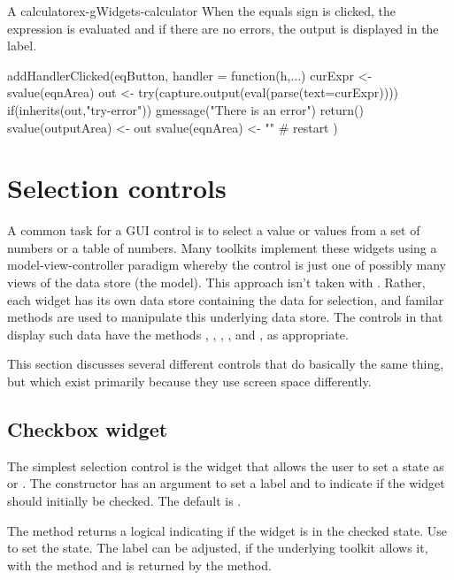 \begin{example}{A calculator}{ex-gWidgets-calculator}
When the equals sign is clicked, the expression is evaluated and if
there are no errors, the output is displayed in the label.
\begin{Schunk}
\begin{Sinput}
 addHandlerClicked(eqButton, handler = function(h,...) {
   curExpr <- svalue(eqnArea)
   out <- try(capture.output(eval(parse(text=curExpr))))
   if(inherits(out,"try-error")) {
     gmessage("There is an error")
     return()
   }
   svalue(outputArea) <- out
   svalue(eqnArea) <- ""            # restart
 })
\end{Sinput}
\end{Schunk}

\end{example}

\section{Selection controls}
\label{sec:gWidgets-widg-select-data}

A common task for a GUI control is to select a value or values from a
set of numbers or a table of numbers. Many toolkits implement these
widgets using a model-view-controller paradigm whereby the control is
just one of possibly many views of the data store (the model). This
approach isn't taken with . Rather, each widget has its own data store
containing the data for selection, and familar \R\/ methods are used to
manipulate this underlying data store. The controls in  that
display such data have the methods \code{[}, \code{[\ASSIGN},
, ,  and , as
appropriate.

This section discusses several different controls that do basically the
same thing, but which exist primarily because they use screen space differently.


\subsection{Checkbox widget}
\label{sec:gWidgets-checkbox-widget}

The simplest selection control is the  widget
that allows the user to set a state as  or
. The constructor has an argument
 to set a label and
 to indicate if the widget should
initially be checked. The default is .

The  method returns a logical indicating if
the widget is in the checked state. Use  to set
the state. The label can be adjusted, if the underlying toolkit allows
it, with the \method{[\ASSIGN}{gcheckbox} method and is returned by the
\method{[}{gcheckbox} method.

